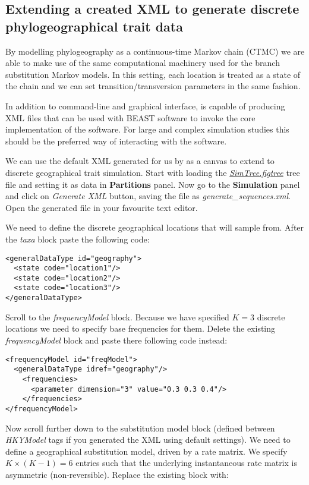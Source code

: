 \subsection{Extending a created XML to generate discrete phylogeographical trait data}
By modelling  phylogeography as a continuous-time Markov chain (CTMC) we are able to make use of the same computational machinery used for the branch substitution Markov models. In this setting, each location is treated as a state of the chain and we can set transition/transversion parameters in the same fashion.

In addition to command-line and graphical interface, {\bussname} is capable of producing XML files that can be used with BEAST software to invoke the core implementation of the software. 
For large and complex simulation studies this should be the preferred way of interacting with the software.

We can use the default XML generated for us by {\bussname} as a canvas to extend to discrete geographical trait simulation. 
Start with loading the \href{http://rega.kuleuven.be/cev/ecv/software/buss_files/simtree.figtree}{\emph{SimTree.figtree}} tree file and setting it as data in \textbf{Partitions} panel. 
Now go to the \textbf{Simulation} panel and click on \emph{Generate XML} button, saving the file as \emph{generate\_sequences.xml}.
Open the generated file in your favourite text editor.

We need to define the discrete geographical locations that {\bussname} will sample from. After the \emph{taxa} block paste the following code:

\begin{lstlisting}
<generalDataType id="geography"> 
  <state code="location1"/>
  <state code="location2"/>
  <state code="location3"/>
</generalDataType>
\end{lstlisting}

Scroll to the \emph{frequencyModel} block. Because we have specified $K=3$ discrete locations we need to specify base frequencies for them. Delete the existing \emph{frequencyModel} block and paste there following code instead:

\begin{lstlisting}
<frequencyModel id="freqModel">
  <generalDataType idref="geography"/>
    <frequencies>
      <parameter dimension="3" value="0.3 0.3 0.4"/>
    </frequencies>
</frequencyModel>
\end{lstlisting}

Now scroll further down to the substitution model block (defined between \emph{HKYModel} tags if you generated the XML using default settings). We need to define a geographical substitution model, driven by a rate matrix. 
We specify $K\times(K-1)=6$ entries such that the underlying instantaneous rate matrix is asymmetric (non-reversible). 
Replace the existing block with: 

